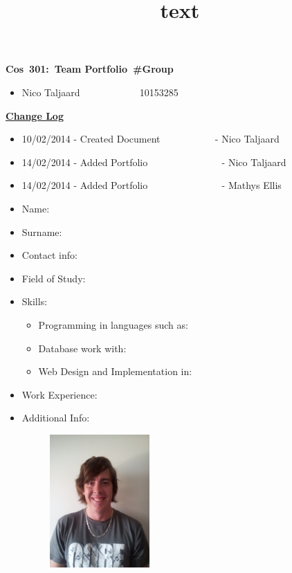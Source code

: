 \documentclass[12pt]{article}
\newcommand{\Title}{Team Portfolio\ \#Group } %
\newcommand{\Class}{Cos\ 301} %
\begin{document}
\title{text}
	\vspace{2in}
	\hspace{1.5in}
	\textmd{\textbf{\Class:\ \Title}}\\
	\vspace{1.5in}


\begin{itemize} %
	\item Nico Taljaard \ ~~~~~~~~~ \ 10153285
	
\end{itemize}

\newpage
\textbf{\underline{Change Log}}
\begin{itemize}
	\item 10/02/2014 - Created Document \ ~~~~~~~~ \ - Nico Taljaard
	\item 14/02/2014 - Added Portfolio \ ~~~~~~~~~~~~ \ - Nico Taljaard
	\item 14/02/2014 - Added Portfolio \ ~~~~~~~~~~~~ \ - Mathys Ellis
\end{itemize}


\newpage %

\begin{itemize}
	\item Name: \ ~~~~~~~~~~~~~~~ \ 
	\item Surname: \ ~~~~~~~~~~~ \ 
	\item Contact info: \ ~~~~~~ \  
	\item Field of Study: \ ~~~~ \ 
	\item Skills: \begin{itemize}
					\item Programming in languages such as:
					\item Database work with: 
					\item Web Design and Implementation in:     %
				  \end{itemize}
	\item Work Experience: \  \ 
	\item Additional Info: \ ~~ \ 	
\end{itemize}

\newpage
\begin{figure}[ht!]
	\centering
	\includegraphics[width=2in, height=2in]{./Pictures/NicoTaljaard.jpg}
\end{figure}
\end{document}
